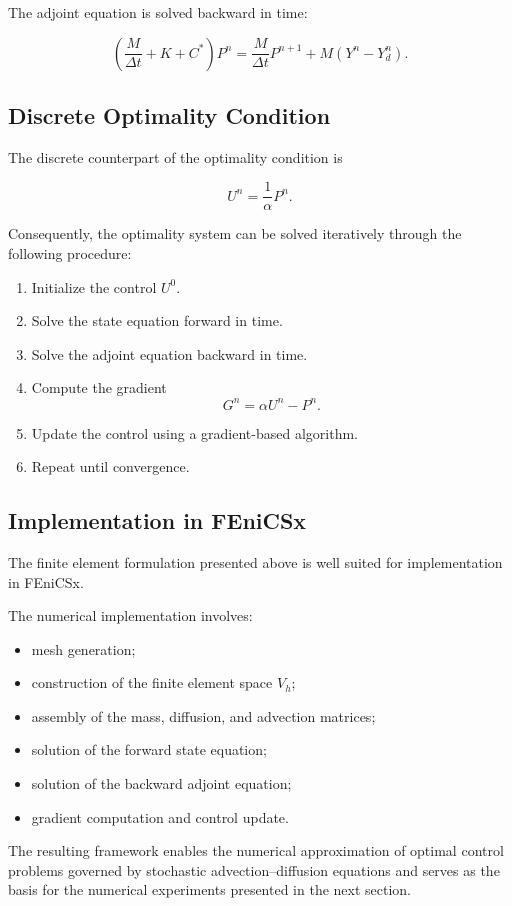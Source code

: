 The adjoint equation is solved backward in time:

\begin{equation}
\left(
\frac{M}{\Delta t}
+
K+C^\ast
\right)
P^{n}
=
\frac{M}{\Delta t}P^{n+1}
+
M(Y^n-Y_d^n).
\label{eq:euler_adjoint}
\end{equation}

\subsection{Discrete Optimality Condition}

The discrete counterpart of the optimality condition is

\begin{equation}
U^n
=
\frac{1}{\alpha}
P^n.
\label{eq:discrete_control}
\end{equation}

Consequently, the optimality system can be solved iteratively through the following procedure:

\begin{enumerate}
\item Initialize the control \(U^0\).
\item Solve the state equation forward in time.
\item Solve the adjoint equation backward in time.
\item Compute the gradient
\[
G^n
=
\alpha U^n-P^n.
\]
\item Update the control using a gradient-based algorithm.
\item Repeat until convergence.
\end{enumerate}

\subsection{Implementation in FEniCSx}

The finite element formulation presented above is well suited for implementation in FEniCSx.

The numerical implementation involves:

\begin{itemize}
\item mesh generation;
\item construction of the finite element space \(V_h\);
\item assembly of the mass, diffusion, and advection matrices;
\item solution of the forward state equation;
\item solution of the backward adjoint equation;
\item gradient computation and control update.
\end{itemize}

The resulting framework enables the numerical approximation of optimal control problems governed 
by stochastic advection--diffusion equations and serves as the basis for the numerical experiments 
presented in the next section.
